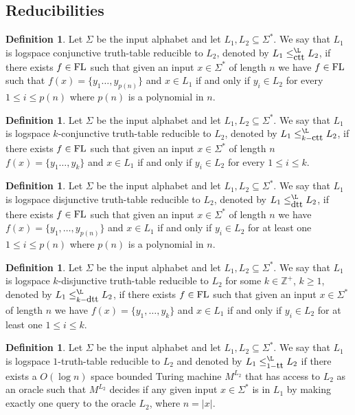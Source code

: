 \documentclass{amsbook}
\theoremstyle{definition}
\newtheorem{definition}[theorem]{Definition}
\theoremstyle{remark}
\numberwithin{section}{chapter}
\numberwithin{equation}{chapter}
\newcommand{\FL}{\mbox{\rm FL}}
\newcommand{\Z}{\mathbb{Z}}
\newcommand{\ctt}{\mbox{\small{\rm ctt}}}
\newcommand{\dtt}{\mbox{\small{\rm dtt}}}
\newcommand{\trt}{\mbox{\small{\rm tt}}}
\begin{document}
\subsection{Reducibilities}
\begin{definition}
Let $\Sigma$ be the input alphabet and let $L_1,L_2\subseteq\Sigma^{*}$. We say that $L_1$ is logspace conjunctive truth-table reducible to $L_2$, denoted by $L_1\leq ^{\L}_{\ctt}L_2$, if there exists $f\in\FL$ such that given an input $x\in\Sigma ^{*}$ of length $n$ we have $f\in\FL$ such that $f(x)=\{ y_1\ldots ,y_{p(n)}\}$ and $x\in L_1$ if and only if $y_i\in L_2$ for every $1\leq i\leq p(n)$ where $p(n)$ is a polynomial in $n$.
\end{definition}
\begin{definition}
Let $\Sigma$ be the input alphabet and let $L_1,L_2\subseteq\Sigma^{*}$. We say that $L_1$ is logspace $k$-conjunctive truth-table reducible to $L_2$, denoted by $L_1\leq ^{\L}_{k-\ctt}L_2$, if there exists $f\in\FL$ such that given an input $x\in\Sigma ^{*}$ of length $n$ $f(x)=\{ y_1\ldots ,y_k\}$ and $x\in L_1$ if and only if $y_i\in L_2$ for every $1\leq i\leq k$.
\end{definition}
\begin{definition}
Let $\Sigma$ be the input alphabet and let $L_1,L_2\subseteq\Sigma^{*}$. We say that $L_1$ is logspace disjunctive truth-table reducible to $L_2$, denoted by $L_1\leq ^{\L}_{\dtt}L_2$, if there exists $f\in\FL$ such that given an input $x\in\Sigma ^{*}$ of length $n$ we have $f(x)=\{ y_1,\ldots ,y_{p(n)}\}$ and $x\in L_1$ if and only if $y_i\in L_2$ for at least one $1\leq i\leq p(n)$ where $p(n)$ is a polynomial in $n$.
\end{definition}
\begin{definition}
Let $\Sigma$ be the input alphabet and let $L_1,L_2\subseteq\Sigma^{*}$. We say that $L_1$ is logspace $k$-disjunctive truth-table reducible to $L_2$ for some $k\in\Z^{+}$, $k\geq 1$, denoted by $L_1\leq ^{\L}_{k-\dtt}L_2$, if there exists  $f\in\FL$ such that given an input $x\in\Sigma ^{*}$ of length $n$ we have $f(x)=\{ y_1,\ldots ,y_k\}$ and $x\in L_1$ if and only if $y_i\in L_2$ for at least one $1\leq i\leq k$.
\end{definition}
\begin{definition}\label{logspace1ttdefn}
Let $\Sigma$ be the input alphabet and let $L_1,L_2\subseteq\Sigma ^{*}$. We say that $L_1$ is logspace $1$-truth-table reducible to $L_2$ and denoted by $L_1\leq^{\L}_{1-\trt}L_2$ if there exists a $O(\log n)$ space bounded Turing machine $M^{L_2}$ that has access to $L_2$ as an oracle such that $M^{L_2}$ decides if any given input $x\in\Sigma^{*}$ is in $L_1$ by making exactly one query to the oracle $L_2$, where $n=|x|$.
\end{definition}
\end{document}
